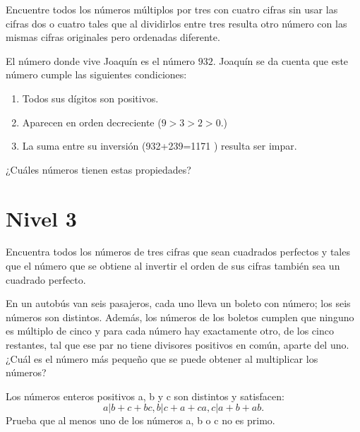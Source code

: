 \begin{problem}[OMMEB 2017]
    Encuentre todos los números múltiplos por tres con cuatro 
    cifras sin usar las cifras dos o cuatro tales que al 
    dividirlos entre tres resulta otro número con las mismas 
    cifras originales pero ordenadas diferente.
\end{problem}

\begin{problem}[OMMEB 2017]
    El número donde vive Joaquín es el número \(932.\) Joaquín se 
    da cuenta que este número cumple las siguientes condiciones:
   \begin{enumerate}
    \item Todos sus dígitos son positivos.
    \item Aparecen en orden decreciente (\(9 > 3 > 2 >0.\))
    \item La suma entre su inversión (932+239=1171 ) resulta ser impar.
   \end{enumerate}
   ¿Cuáles números tienen estas propiedades?
\end{problem}

\section{Nivel 3}

\begin{problem}[OMMEB 2017]
    Encuentra todos los números de tres cifras que sean 
    cuadrados perfectos y tales que el número que se obtiene 
    al invertir el orden de sus cifras también sea un cuadrado 
    perfecto.
\end{problem}

\begin{problem}[OMMEB 2017]
    En un autobús van seis pasajeros, cada uno lleva un boleto 
    con número; los seis números son distintos. Además,
    los números de los boletos cumplen que ninguno es múltiplo 
    de cinco y para cada número hay exactamente otro, de los 
    cinco restantes, tal que ese par no tiene divisores positivos 
    en común, aparte del uno. ¿Cuál es el número más pequeño que 
    se puede obtener al multiplicar los números?
\end{problem}

\begin{problem}[OMMEB 2017]
    Los números enteros positivos a, b y c son distintos y 
    satisfacen:
    \[ 
    a|b + c + bc,
    b|c + a + ca,
    c|a + b + ab.
    \]
    Prueba que al menos uno de los números a, b o c no es primo.
\end{problem}

